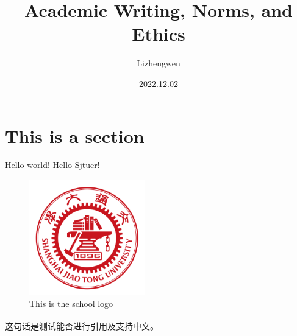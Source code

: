 \documentclass[fontset=windows]{article}
\title{\heiti\zihao{2} Academic Writing, Norms, and Ethics}
\author{\songti Lizhengwen}
\date{2022.12.02}
\newcommand{\upcite}[1]{\textsuperscript{\cite{#1}}}
\begin{document}
	\maketitle





\section{This is a section}
Hello world! Hello Sjtuer! 
\begin{figure}[htbp]
	\centering
	\includegraphics[width=5cm]{fig1.png}
	\caption{This is the school logo}
	\label{1}
\end{figure}

这句话是测试能否进行引用及支持中文\upcite{1}。

\end{document}
